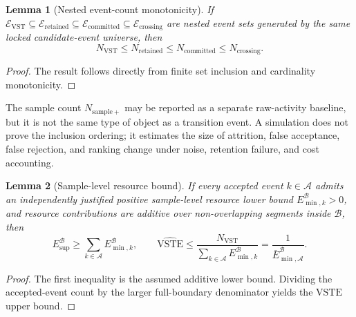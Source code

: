\documentclass[11pt,a4paper]{article}
\newtheorem{lemma}{Lemma}
\newcommand{\VST}{\ensuremath{\mathrm{VST}}}
\newcommand{\VSTE}{\ensuremath{\mathrm{VSTE}}}
\newcommand{\1}{\mathbf{1}}
\begin{document}
\begin{lemma}[Nested event-count monotonicity]
If $\mathcal{E}_{\VST}\subseteq\mathcal{E}_{\mathrm{retained}}\subseteq\mathcal{E}_{\mathrm{committed}}\subseteq\mathcal{E}_{\mathrm{crossing}}$ are nested event sets generated by the same locked candidate-event universe, then
\[
  N_{\VST}\leq N_{\mathrm{retained}}\leq N_{\mathrm{committed}}\leq N_{\mathrm{crossing}}.
\]
\end{lemma}

\begin{proof}
The result follows directly from finite set inclusion and cardinality monotonicity.
\end{proof}

The sample count $N_{\mathrm{sample+}}$ may be reported as a separate raw-activity baseline, but it is not the same type of object as a transition event. A simulation does not prove the inclusion ordering; it estimates the size of attrition, false acceptance, false rejection, and ranking change under noise, retention failure, and cost accounting.

\begin{lemma}[Sample-level resource bound]
If every accepted event $k\in\mathcal{A}$ admits an independently justified positive sample-level resource lower bound $E_{\min,k}^{\mathcal{B}}>0$, and resource contributions are additive over non-overlapping segments inside $\mathcal{B}$, then
\[
  E_{\mathrm{sup}}^{\mathcal{B}}\geq\sum_{k\in\mathcal{A}}E_{\min,k}^{\mathcal{B}},
  \qquad
  \widehat{\VSTE}\leq
  \frac{N_{\VST}}{\sum_{k\in\mathcal{A}}E_{\min,k}^{\mathcal{B}}}
  =
  \frac{1}{\bar E_{\min,\mathcal{A}}^{\mathcal{B}}}.
\]
\end{lemma}

\begin{proof}
The first inequality is the assumed additive lower bound. Dividing the accepted-event count by the larger full-boundary denominator yields the \VSTE{} upper bound.
\end{proof}
\end{document}
